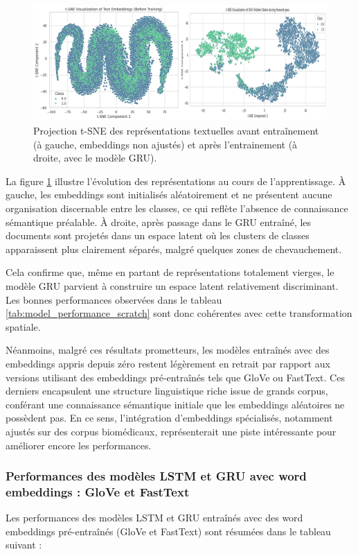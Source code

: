 \documentclass[12pt]{report}
\begin{document}
\begin{figure}[H]
\centering
\includegraphics[width=0.7\linewidth]{No_Embeddings_GRU.png}
\caption{Projection t-SNE des représentations textuelles avant entraînement (à gauche, embeddings non ajustés) et après l'entrainement (à droite, avec le modèle GRU).}
\label{fig:tsne_gru}
\end{figure}

La figure \ref{fig:tsne_gru} illustre l’évolution des représentations au cours de l’apprentissage. À gauche, les embeddings sont initialisés aléatoirement et ne présentent aucune organisation discernable entre les classes, ce qui reflète l’absence de connaissance sémantique préalable. À droite, après passage dans le GRU entraîné, les documents sont projetés dans un espace latent où les clusters de classes apparaissent plus clairement séparés, malgré quelques zones de chevauchement.

Cela confirme que, même en partant de représentations totalement vierges, le modèle GRU parvient à construire un espace latent relativement discriminant. Les bonnes performances observées dans le tableau \ref{tab:model_performance_scratch} sont donc cohérentes avec cette transformation spatiale.

Néanmoins, malgré ces résultats prometteurs, les modèles entraînés avec des embeddings appris depuis zéro restent légèrement en retrait par rapport aux versions utilisant des embeddings pré-entraînés tels que GloVe ou FastText. Ces derniers encapsulent une structure linguistique riche issue de grands corpus, conférant une connaissance sémantique initiale que les embeddings aléatoires ne possèdent pas. En ce sens, l’intégration d’embeddings spécialisés, notamment ajustés sur des corpus biomédicaux, représenterait une piste intéressante pour améliorer encore les performances.

\subsubsection{Performances des modèles LSTM et GRU avec word embeddings : GloVe et FastText}

Les performances des modèles LSTM et GRU entraînés avec des word embeddings pré-entraînés (GloVe et FastText) sont résumées dans le tableau suivant :
\end{document}
